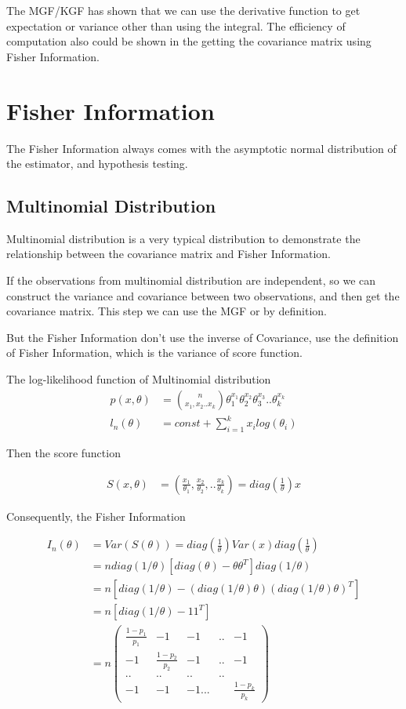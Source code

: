 \documentclass[11pt]{article} %
\begin{document}
The MGF/KGF has shown that we can use the derivative function to get expectation or variance other than using the integral. The efficiency of computation also could be shown in the getting the covariance matrix using Fisher Information.


\section{Fisher Information}

The Fisher Information always comes with the asymptotic normal distribution of the estimator, and hypothesis testing.

\subsection{Multinomial Distribution}
Multinomial distribution is a very typical distribution to demonstrate the relationship between the covariance matrix and Fisher Information.

If the observations from multinomial distribution are independent, so we can construct the variance and covariance between two observations, and then get the covariance matrix. This step we can use the MGF or by definition.

But the Fisher Information don't use the inverse of Covariance, use the definition of Fisher Information, which is the variance of score function.

The log-likelihood function of Multinomial distribution 
\begin{align*}
	p(x, \theta) &= {n \choose x_1, x_2.. x_k} \theta_1^{x_1} \theta_2^{x_2} \theta_3^{x_3}.. \theta_k^{x_k} \\
	l_n(\theta) &= const + \sum_{i=1}^k x_i log(\theta_i)
\end{align*}

Then the score function

\begin{align*}
	S(x, \theta) &= \left(\frac{x_1}{\theta_1}, \frac{x_2}{\theta_2},.. \frac{x_k}{\theta_k} \right) = diag(\frac{1}{\theta}) x
\end{align*}

Consequently, the Fisher Information

\begin{align*}
	I_n(\theta) &= Var(S(\theta)) = diag(\frac{1}{\theta}) Var(x) diag(\frac{1}{\theta})\\
	&= n diag(1/\theta) [diag(\theta) - \theta \theta^T] diag(1/\theta)\\
	&= n \left[ diag(1/\theta) - (diag(1/\theta) \theta) (diag(1/\theta) \theta)^T  \right]\\
	&= n \left[ diag(1/\theta) - 11^T  \right]\\
	&= n \begin{pmatrix}
		\frac{1-p_1}{p_1} & -1 & -1 &.. & -1 \\
		-1 & \frac{1-p_2}{p_2} & -1 &.. &-1 \\
		..&..&..&..& \\
		-1 & -1 & -1... & & \frac{1-p_k}{p_k}
	\end{pmatrix}
\end{align*}
\end{document}

